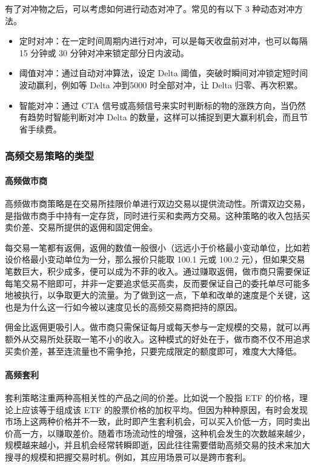 有了对冲物之后，可以考虑如何进行动态对冲了。常见的有以下 3 种动态对冲方法。
\begin{itemize}
    \item 定时对冲：在一定时间周期内进行对冲，可以是每天收盘前对冲，也可以每隔 15 分钟或 30 分钟对冲来锁定部分日内波动。
    \item 阈值对冲：通过自动对冲算法，设定 Delta 阈值，突破时瞬间对冲锁定短时间波动赢利，例如等 Delta 冲到5000 时全部对冲，让 Delta 归零、再次积累。
    \item 智能对冲：通过 CTA 信号或高频信号来实时判断标的物的涨跌方向，当仍然有趋势时智能判断对冲 Delta 的数量，这样可以捕捉到更大赢利机会，而且节省手续费。
\end{itemize}

\subsubsection*{高频交易策略的类型}
\paragraph{高频做市商} 高频做市商策略是在交易所挂限价单进行双边交易以提供流动性。所谓双边交易，是指做市商手中持有一定存货，同时进行买和卖两方交易。这种策略的收入包括买卖价差、交易所提供的返佣和固定佣金。

每交易一笔都有返佣，返佣的数值一般很小（远远小于价格最小变动单位，比如若设价格最小变动单位为一分，那么报价只能取 100.1 元或 100.2 元），但如果交易笔数巨大，积少成多，便可以成为不菲的收入。通过赚取返佣，做市商只需要保证每笔交易不赔即可，并非一定要追求低买高卖，反而要保证自己的委托单尽可能多地被执行，以争取更大的流量。为了做到这一点，下单和改单的速度是个关键，这也是为什么这一行如今被以速度见长的高频交易商把持的原因。

佣金比返佣更吸引人。做市商只需保证每月或每天参与一定规模的交易，就可以再额外从交易所处获取一笔不小的收入。这种模式的好处在于，做市商不仅不用追求买卖价差，甚至连流量也不需争抢，只要完成限定的额度即可，难度大大降低。

\paragraph{高频套利} 套利策略注重两种高相关性的产品之间的价差。比如说一个股指 ETF 的价格，理论上应该等于组成该 ETF 的股票价格的加权平均。但因为种种原因，有时会发现市场上这两种价格并不一致，此时即产生套利机会，可以买入价低一方，同时卖出价高一方，以赚取差价。随着市场流动性的增强，这种机会发生的次数越来越少，规模越来越小，并且机会经常转瞬即逝，因此往往需要借助高频交易的技术来加大搜寻的规模和把握交易时机。例如，其应用场景可以是跨市套利。

